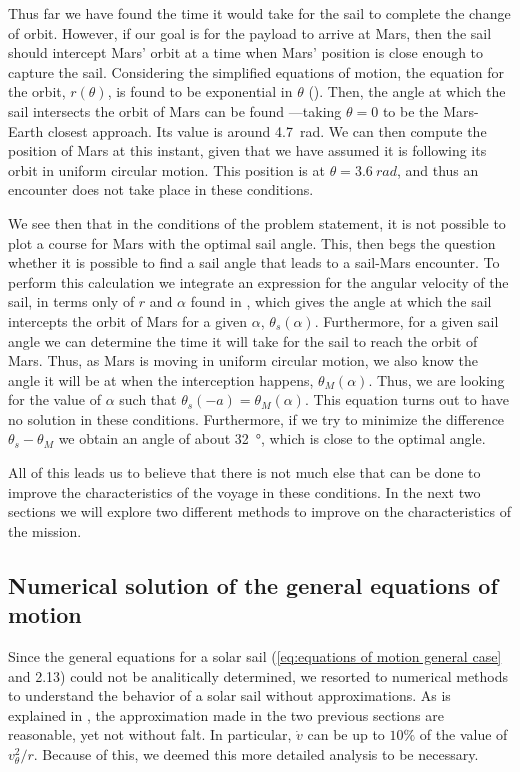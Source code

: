 \documentclass[twocolumn,12pt,a4paper]{article}
\numberwithin{equation}{section}
\begin{document}
Thus far we have found the time it would take for the sail to complete the change of orbit. However, if our goal is for the payload to arrive at Mars, then the sail should intercept Mars' orbit at a time when Mars' position is close enough to capture the sail. Considering the simplified equations of motion, the equation for the orbit, \( r(\theta) \), is found to be exponential in \( \theta \) (\cite[p. 155]{mcinnes}). Then, the angle at which the sail intersects the orbit of Mars can be found ---taking \( \theta = 0	\) to be the Mars-Earth closest approach. Its value is around \SI{4.7}{rad}. We can then compute the position of Mars at this instant, given that we have assumed it is following its orbit in uniform circular motion. This position is at \( \theta = \SI{3.6}{rad} \), and thus an encounter does not take place in these conditions. 

We see then that in the conditions of the problem statement, it is not possible to plot a course for Mars with the optimal sail angle. This, then begs the question whether it is possible to find a sail angle that leads to a sail-Mars encounter. To perform this calculation we integrate an expression for the angular velocity of the sail, in terms only of \( r \) and \( \alpha \) found in \cite[p. 156]{mcinnes}, which gives the angle at which the sail intercepts the orbit of Mars for a given \( \alpha \), \( \theta_s(\alpha) \). Furthermore, for a given sail angle we can determine the time it will take for the sail to reach the orbit of Mars. Thus, as Mars is moving in uniform circular motion, we also know the angle it will be at when the interception happens, \( \theta_M(\alpha) \). Thus, we are looking for the value of \( \alpha \) such that \( \theta_s(-a) = \theta_M(\alpha) \). This equation turns out to have no solution in these conditions. Furthermore, if we try to minimize the difference \( \theta_s - \theta_M \) we obtain an angle of about \SI{32}{\degree}, which is close to the optimal angle.

All of this leads us to believe that there is not much else that can be done to improve the characteristics of the voyage in these conditions. In the next two sections we will explore two different methods to improve on the characteristics of the mission.

\subsection{Numerical solution of the general equations of motion}
Since the general equations for a solar sail (\autoref{eq:equations of motion general case} and 2.13) could not be analitically determined, we resorted to numerical methods to understand the behavior of a solar sail without approximations. As is explained in \cite{tsu}, the approximation made in the two previous sections are reasonable, yet not without falt. In particular, \( \dot{v} \) can be up to \( 10 \% \) of the value of \( v_{\theta}^2/r \). Because of this, we deemed this more detailed analysis to be necessary. 
\end{document}
